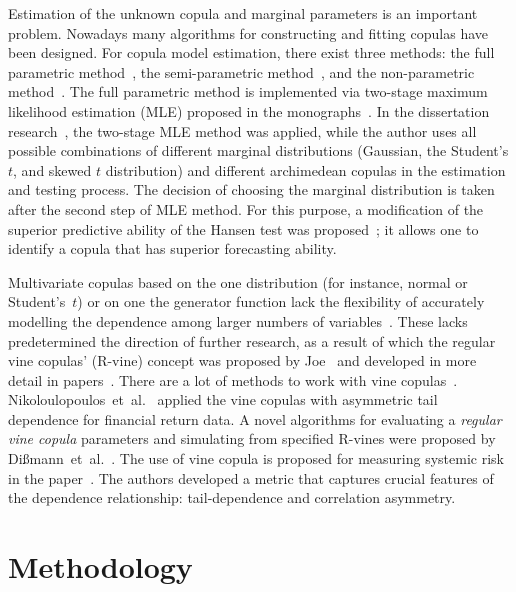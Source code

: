 Estimation of the unknown copula and marginal parameters is an important problem.
Nowadays many algorithms for constructing and fitting copulas have been designed.
For copula model estimation, there exist three methods: the full parametric method~\cite{Patton2006}, the semi-parametric method~\cite{Chen2006, Lourme2016}, and the non-parametric method~\cite{Fermanian2003, Kim2007}.
The full parametric method is implemented via two-stage maximum likelihood estimation (MLE) proposed in the monographs~\cite{Joe1997, Joe2014}.
In the dissertation research~\cite{Xu2008}, the two-stage  MLE method was applied, while the author uses all possible combinations of different marginal distributions (Gaussian, the Student's $t$, and skewed $t$ distribution) and different archimedean copulas in the estimation and testing process. 
The decision of choosing the marginal distribution is taken after the second step of MLE method.
For this purpose, a modification of the superior predictive ability of the Hansen test was proposed~\cite{Hansen2005}; it allows one to identify a copula that has superior forecasting ability.

Multivariate copulas based on the one distribution (for instance, normal or Student's~$t$) or on one the generator function lack the flexibility of accurately modelling the dependence among larger numbers of variables~\cite{Brechmann2013}. 
These lacks predetermined the direction of further research, as a result of which the regular vine copulas' (R-vine) concept was proposed by Joe~\cite{Joe1996} and developed in more detail in papers~\cite{Brechmann2013,Cooke2015}.
There are a lot of methods to work with vine copulas~\cite{Cooke2015,Czado2010,Dissmann2013,Nikoloulopoulos2012}. Nikoloulopoulos~et~al.~\cite{Nikoloulopoulos2012} applied the vine copulas with asymmetric tail dependence for financial return data.
A novel algorithms for evaluating a \textit{regular vine copula} parameters and simulating
from specified R-vines were proposed by Di{\ss}mann~et~al.~\cite{Dissmann2013}. 
The use of vine copula is proposed for measuring systemic risk in the paper~\cite{Pourkhanali2016}. 
The authors developed a metric that captures crucial features of the dependence relationship: tail-dependence and correlation asymmetry.


\section*{Methodology}


